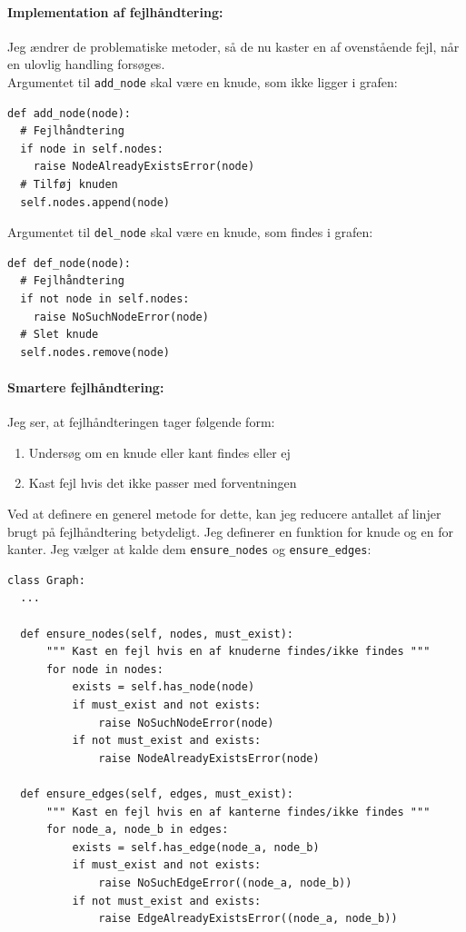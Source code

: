 \documentclass[10pt,a4paper,danish]{article}
\newcommand{\ct}{\texttt}
\begin{document}
\paragraph{Implementation af fejlhåndtering:}
Jeg ændrer de problematiske metoder, så de nu kaster en af
ovenstående fejl, når en ulovlig handling forsøges.\\

Argumentet til \ct{add\_node} skal være en knude, som ikke ligger i
grafen:
{\small
\begin{verbatim}
def add_node(node):
  # Fejlhåndtering
  if node in self.nodes:
    raise NodeAlreadyExistsError(node)
  # Tilføj knuden
  self.nodes.append(node)
\end{verbatim}}

Argumentet til \ct{del\_node} skal være en knude, som findes i grafen:
{\small
\begin{verbatim}
def def_node(node):
  # Fejlhåndtering
  if not node in self.nodes:
    raise NoSuchNodeError(node)
  # Slet knude
  self.nodes.remove(node)
\end{verbatim}}

\paragraph{Smartere fejlhåndtering:}
Jeg ser, at fejlhåndteringen tager følgende form:
\begin{enumerate}
\item Undersøg om en knude eller kant findes eller ej
\item Kast fejl hvis det ikke passer med forventningen
\end{enumerate}

Ved at definere en generel metode for dette, kan jeg reducere antallet
af linjer brugt på fejlhåndtering betydeligt. Jeg definerer en
funktion for knude og en for kanter. Jeg vælger at kalde dem
\ct{ensure\_nodes} og \ct{ensure\_edges}:

\begin{samepage}
{\small
\begin{verbatim}
class Graph:
  ...

  def ensure_nodes(self, nodes, must_exist):
      """ Kast en fejl hvis en af knuderne findes/ikke findes """
      for node in nodes:
          exists = self.has_node(node)
          if must_exist and not exists:
              raise NoSuchNodeError(node)
          if not must_exist and exists:
              raise NodeAlreadyExistsError(node)

  def ensure_edges(self, edges, must_exist):
      """ Kast en fejl hvis en af kanterne findes/ikke findes """
      for node_a, node_b in edges:
          exists = self.has_edge(node_a, node_b)
          if must_exist and not exists:
              raise NoSuchEdgeError((node_a, node_b))
          if not must_exist and exists:
              raise EdgeAlreadyExistsError((node_a, node_b))
\end{verbatim}}
\end{samepage}
\end{document}
